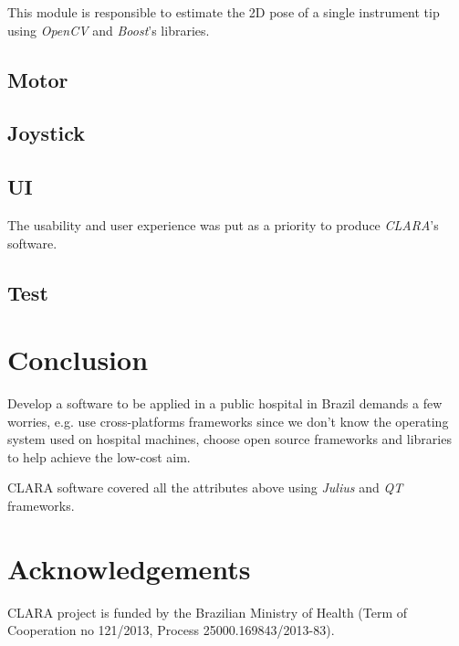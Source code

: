 \documentclass{svproc}
\begin{document}
\begin{multicols}{2}
	This module is responsible to estimate the 2D pose of a single instrument tip\cite{vision} using \textit{OpenCV} and \textit{Boost}'s libraries.
	
	\subsection{Motor}
	
	\subsection{Joystick}
	
	\subsection{UI}
	
	The usability and user experience was put as a priority to produce \textit{CLARA}'s software. 
	
	
	\subsection{Test}
	
	\section{Conclusion}

	Develop a software to be applied in a public hospital in Brazil demands a few worries, e.g. use cross-platforms frameworks since we don't know the operating system used on hospital machines, choose open source frameworks and libraries to help achieve the low-cost aim.
	
	CLARA software covered all the attributes above using \textit{Julius} and \textit{QT} frameworks. 
	
	\section{Acknowledgements}
	
	CLARA project is funded by the Brazilian Ministry of Health (Term of Cooperation no 121/2013, Process 25000.169843/2013-83). 
		
	
	 
	
	\end{multicols}
	
\end{document}
